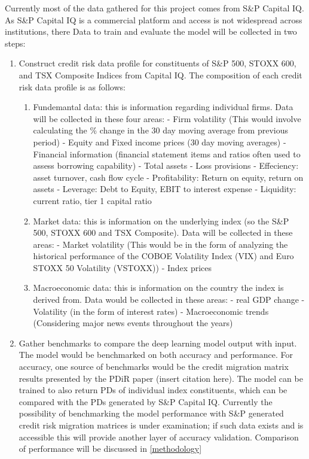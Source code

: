 \documentclass[10pt]{article}
\begin{document}
\begin{multicols*}{2}
Currently most of the data gathered for this project comes from S\&P Capital IQ. As S\&P Capital IQ is a commercial platform and access is not widespread across institutions, there
Data to train and evaluate the model will be collected in two steps:
\begin{enumerate}
	\item Construct credit risk data profile for constituents of S\&P 500, STOXX 600, and TSX Composite Indices from Capital IQ. 
	The composition of each credit risk data profile is as follows:
	\begin{enumerate}
		\item Fundemantal data: this is information regarding individual firms. Data will be collected in these four areas:
			- Firm volatility (This would involve calculating the \% change in the 30 day moving average from previous period)
			- Equity and Fixed income prices (30 day moving averages)
			- Financial information (financial statement items and ratios often used to assess borrowing capability)
				- Total assets
				- Loss provisions
				- Effeciency: asset turnover, cash flow cycle
				- Profitability: Return on equity, return on assets
				- Leverage: Debt to Equity, EBIT to interest expense
				- Liquidity: current ratio, tier 1 capital ratio
		\item Market data: this is information on the underlying index (so the S\&P 500, STOXX 600 and TSX Composite). Data will be collected in these areas:
			- Market volatility (This would be in the form of analyzing the historical performance of the COBOE Volatility Index (VIX) and Euro STOXX 50 Volatility (VSTOXX))
			- Index prices
		\item Macroeconomic data: this is information on the country the index is derived from. Data would be collected in these areas:
			- real GDP change
			- Volatility (in the form of interest rates)
			- Macroeconomic trends (Considering major news events throughout the years)
	\end{enumerate} 
	\item Gather benchmarks to compare the deep learning model output with input. The model would be benchmarked on both accuracy and performance.
	For accuracy, one source of benchmarks would be the credit migration matrix results presented by the PDiR paper (insert citation here).
	The model can be trained to also return PDs of individual index constituents, which can be compared with the PDs generated by S\&P Capital IQ. 
	Currently the possibility of benchmarking the model performance with S\&P generated credit risk migration matrices is under examination; 
	if such data exists and is accessible this will provide another layer of accuracy validation. Comparison of performance will be discussed in \ref{methodology}
\end{enumerate}


\end{multicols*}
\end{document}
